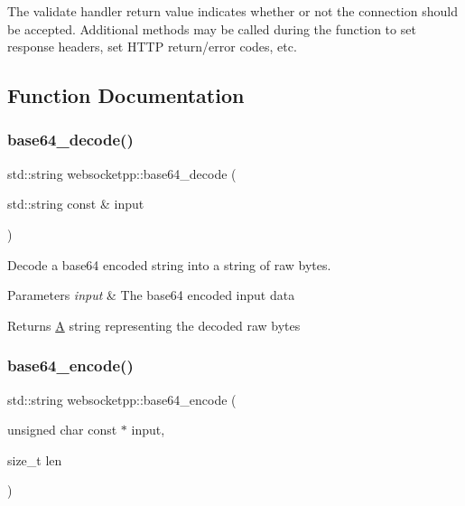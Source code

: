 The validate handler return value indicates whether or not the connection should be accepted. Additional methods may be called during the function to set response headers, set H\+T\+TP return/error codes, etc. 

\subsection{Function Documentation}
\mbox{\label{namespacewebsocketpp_a1467174a88a2f4037c45dbeb9d57c481}} 
\subsubsection{\texorpdfstring{base64\+\_\+decode()}{base64\_decode()}}
{\footnotesize\ttfamily std\+::string websocketpp\+::base64\+\_\+decode (\begin{DoxyParamCaption}\item[{std\+::string const \&}]{input }\end{DoxyParamCaption})\hspace{0.3cm}{\ttfamily [inline]}}



Decode a base64 encoded string into a string of raw bytes. 


\begin{DoxyParams}{Parameters}
{\em input} & The base64 encoded input data \\
\hline
\end{DoxyParams}
\begin{DoxyReturn}{Returns}
\mbox{\hyperlink{struct_a}{A}} string representing the decoded raw bytes 
\end{DoxyReturn}
\mbox{\label{namespacewebsocketpp_aff36d40583424a2c879df02219133af8}} 
\subsubsection{\texorpdfstring{base64\+\_\+encode()}{base64\_encode()}\hspace{0.1cm}{\footnotesize\ttfamily [1/2]}}
{\footnotesize\ttfamily std\+::string websocketpp\+::base64\+\_\+encode (\begin{DoxyParamCaption}\item[{unsigned char const $\ast$}]{input,  }\item[{size\+\_\+t}]{len }\end{DoxyParamCaption})\hspace{0.3cm}{\ttfamily [inline]}}



